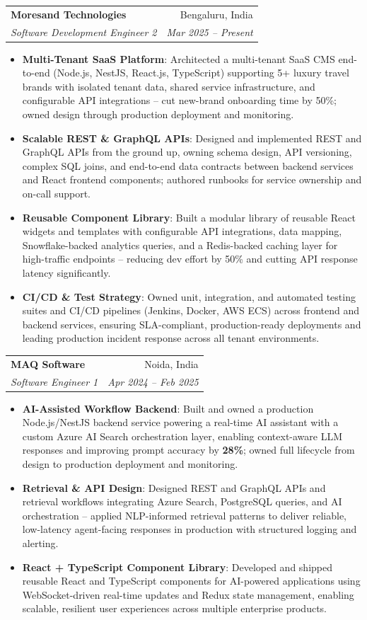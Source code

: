 \documentclass[a4paper,20pt]{article}
\makeatletter
\newcommand{\resumeItem}[2]{\item\small{\textbf{#1}{: #2 \vspace{-2pt}}}}
\newcommand{\resumeSubheading}[4]{\vspace{-1pt}\item\begin{tabular*}{0.97\textwidth}{l@{\extracolsep{\fill}}r}\textbf{#1} & #2 \\\textit{#3} & \textit{#4} \\\end{tabular*}\vspace{-5pt}}
\newcommand{\resumeItemListStart}{\begin{itemize}}
\newcommand{\resumeItemListEnd}{\end{itemize}\vspace{-5pt}}
\makeatother
\begin{document}
  \resumeSubheading
    {Moresand Technologies}{Bengaluru, India}
    {Software Development Engineer 2}{Mar 2025 -- Present}
    \resumeItemListStart
      \resumeItem{Multi-Tenant SaaS Platform}{Architected a multi-tenant SaaS CMS end-to-end (Node.js, NestJS, React.js, TypeScript) supporting 5+ luxury travel brands with isolated tenant data, shared service infrastructure, and configurable API integrations -- cut new-brand onboarding time by 50\%; owned design through production deployment and monitoring.}
      \resumeItem{Scalable REST \& GraphQL APIs}{Designed and implemented REST and GraphQL APIs from the ground up, owning schema design, API versioning, complex SQL joins, and end-to-end data contracts between backend services and React frontend components; authored runbooks for service ownership and on-call support.}
      \resumeItem{Reusable Component Library}{Built a modular library of reusable React widgets and templates with configurable API integrations, data mapping, Snowflake-backed analytics queries, and a Redis-backed caching layer for high-traffic endpoints -- reducing dev effort by 50\% and cutting API response latency significantly.}
      \resumeItem{CI/CD \& Test Strategy}{Owned unit, integration, and automated testing suites and CI/CD pipelines (Jenkins, Docker, AWS ECS) across frontend and backend services, ensuring SLA-compliant, production-ready deployments and leading production incident response across all tenant environments.}
    \resumeItemListEnd

  \resumeSubheading
    {MAQ Software}{Noida, India}
    {Software Engineer 1}{Apr 2024 -- Feb 2025}
    \resumeItemListStart
      \resumeItem{AI-Assisted Workflow Backend}{Built and owned a production Node.js/NestJS backend service powering a real-time AI assistant with a custom Azure AI Search orchestration layer, enabling context-aware LLM responses and improving prompt accuracy by \textbf{28\%}; owned full lifecycle from design to production deployment and monitoring.}
      \resumeItem{Retrieval \& API Design}{Designed REST and GraphQL APIs and retrieval workflows integrating Azure Search, PostgreSQL queries, and AI orchestration -- applied NLP-informed retrieval patterns to deliver reliable, low-latency agent-facing responses in production with structured logging and alerting.}
      \resumeItem{React + TypeScript Component Library}{Developed and shipped reusable React and TypeScript components for AI-powered applications using WebSocket-driven real-time updates and Redux state management, enabling scalable, resilient user experiences across multiple enterprise products.}
    \resumeItemListEnd
\end{document}
